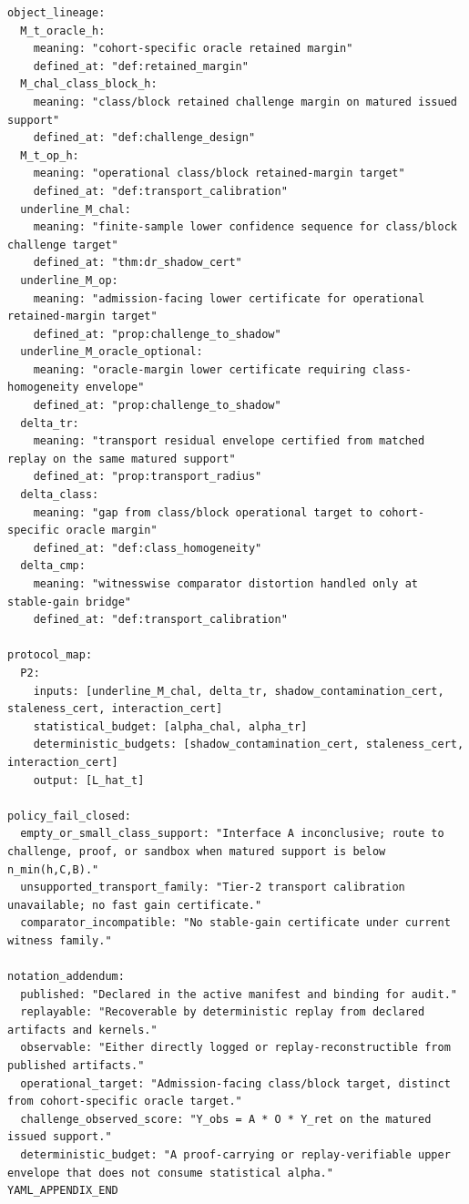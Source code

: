 \documentclass[11pt]{article}
\theoremstyle{definition}
\newcommand{\1}{\mathbf{1}}
\begin{document}
{\begin{verbatim}
object_lineage:
  M_t_oracle_h:
    meaning: "cohort-specific oracle retained margin"
    defined_at: "def:retained_margin"
  M_chal_class_block_h:
    meaning: "class/block retained challenge margin on matured issued support"
    defined_at: "def:challenge_design"
  M_t_op_h:
    meaning: "operational class/block retained-margin target"
    defined_at: "def:transport_calibration"
  underline_M_chal:
    meaning: "finite-sample lower confidence sequence for class/block challenge target"
    defined_at: "thm:dr_shadow_cert"
  underline_M_op:
    meaning: "admission-facing lower certificate for operational retained-margin target"
    defined_at: "prop:challenge_to_shadow"
  underline_M_oracle_optional:
    meaning: "oracle-margin lower certificate requiring class-homogeneity envelope"
    defined_at: "prop:challenge_to_shadow"
  delta_tr:
    meaning: "transport residual envelope certified from matched replay on the same matured support"
    defined_at: "prop:transport_radius"
  delta_class:
    meaning: "gap from class/block operational target to cohort-specific oracle margin"
    defined_at: "def:class_homogeneity"
  delta_cmp:
    meaning: "witnesswise comparator distortion handled only at stable-gain bridge"
    defined_at: "def:transport_calibration"

protocol_map:
  P2:
    inputs: [underline_M_chal, delta_tr, shadow_contamination_cert, staleness_cert, interaction_cert]
    statistical_budget: [alpha_chal, alpha_tr]
    deterministic_budgets: [shadow_contamination_cert, staleness_cert, interaction_cert]
    output: [L_hat_t]

policy_fail_closed:
  empty_or_small_class_support: "Interface A inconclusive; route to challenge, proof, or sandbox when matured support is below n_min(h,C,B)."
  unsupported_transport_family: "Tier-2 transport calibration unavailable; no fast gain certificate."
  comparator_incompatible: "No stable-gain certificate under current witness family."

notation_addendum:
  published: "Declared in the active manifest and binding for audit."
  replayable: "Recoverable by deterministic replay from declared artifacts and kernels."
  observable: "Either directly logged or replay-reconstructible from published artifacts."
  operational_target: "Admission-facing class/block target, distinct from cohort-specific oracle target."
  challenge_observed_score: "Y_obs = A * O * Y_ret on the matured issued support."
  deterministic_budget: "A proof-carrying or replay-verifiable upper envelope that does not consume statistical alpha."
YAML_APPENDIX_END
\end{verbatim}
}
\end{document}
